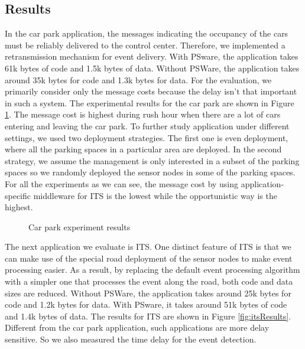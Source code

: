 \subsection{Results}
In the car park application, the messages indicating the occupancy of the cars must be reliably delivered to the control center. Therefore, we implemented a retransmission mechanism for event delivery. With PSware, the application takes 61k bytes of code and 1.5k bytes of data. Without PSWare, the application takes around 35k bytes for code and 1.3k bytes for data. For the evaluation, we primarily consider only the message costs because the delay isn't that important in such a system. The experimental results for the car park are shown in Figure \ref{fig:carParkResults}. The message cost is highest during rush hour when there are a lot of cars entering and leaving the car park. To further study application under different settings, we used two deployment strategies. The first one is even deployment, where all the parking spaces in a particular area are deployed. In the second strategy, we assume the management is only interested in a subset of the parking spaces so we randomly deployed the sensor nodes in some of the parking spaces. For all the experiments as we can see, the message cost by using application-specific middleware for ITS is the lowest while the opportunistic way is the highest.

\begin{figure}
\centering
{}
{}
\caption{Car park experiment results}
\label{fig:carParkResults}
\end{figure}

The next application we evaluate is ITS. One distinct feature of ITS is that we can make use of the special road deployment of the sensor nodes to make event processing easier. As a result, by replacing the default event processing algorithm with a simpler one that processes the event along the road, both code and data sizes are reduced. Without PSWare, the application takes around 25k bytes for code and 1.2k bytes for data. With PSware, it takes around 51k bytes of code and 1.4k bytes of data. The results for ITS are shown in Figure \ref{fig:itsResults}. Different from the car park application, such applications are more delay sensitive. So we also measured the time delay for the event detection. %
 
